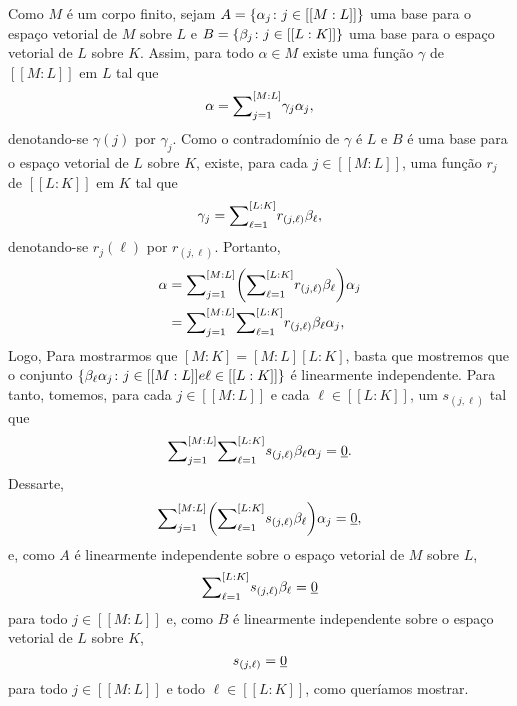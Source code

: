 \begin{dem}
  Como $M$ é um corpo finito, sejam
  $A=\left\{ \alpha_j\colon j\in[[M:L]] \right\}$
  uma base para o espaço vetorial de $M$ sobre $L$ e
  $B=\left\{ \beta_j\colon j\in[[L:K]] \right\}$
  uma base para o espaço vetorial de $L$ sobre $K$. Assim, para todo
  $\alpha\in M$ existe uma função $\gamma$ de $[[M:L]]$ em $L$ tal que
  \begin{equation*}
    \alpha = \mathbf{\sum}_{j=1}^{[M:L]}\gamma_j\alpha_j\mathrm{,}
  \end{equation*}
  denotando-se $\gamma(j)$ por $\gamma_j$. Como o contradomínio de
  $\gamma$ é $L$ e $B$ é uma base para o espaço vetorial
  de $L$ sobre $K$, existe, para cada $j\in[[M:L]]$, uma função $r_j$ de
  $[[L:K]]$ em $K$ tal que
  \begin{equation*}
    \gamma_j
    = \mathbf{\sum}_{\ell=1}^{[L:K]}r_{(j,\ell)}\beta_{\ell}\mathrm{,}
  \end{equation*}
  denotando-se $r_j(\ell)$ por $r_{(j,\ell)}$.
  Portanto,
  \begin{equation*}
    \begin{aligned}
      \alpha &= \mathbf{\sum}_{j=1}^{[M:L]}\biggl(
      \mathbf{\sum}_{\ell=1}^{[L:K]}r_{(j,\ell)}\beta_{\ell}
      \biggr)
      \alpha_j\\
      &= \mathbf{\sum}_{j=1}^{[M:L]}
      \mathbf{\sum}_{\ell=1}^{[L:K]}
      r_{(j,\ell)}\beta_{\ell}
      \alpha_j\mathrm{,}
    \end{aligned}
  \end{equation*}
  Logo, Para mostrarmos que $[M:K]=[M:L][L:K]$, basta que mostremos que
  o conjunto $\left\{ \beta_{\ell}\alpha_{j}\colon j\in[[M:L]] e
    \ell\in[[L:K]] \right\}$ é linearmente independente.
  Para tanto, tomemos,
  para cada $j\in[[M:L]]$ e cada $\ell\in[[L:K]]$,
    um $s_{(j,\ell)}$ tal
  que
  \begin{equation*}
    \mathbf{\sum}_{j=1}^{[M:L]}\mathbf{\sum}_{\ell=1}^{[L:K]}
    s_{(j,\ell)}\beta_{\ell}\alpha_j=\underline{0}\mathrm{.}
  \end{equation*}
  Dessarte,
  \begin{equation*}
    \mathbf{\sum}_{j=1}^{[M:L]}\biggl(
    \mathbf{\sum}_{\ell=1}^{[L:K]}
    s_{(j,\ell)}\beta_{\ell}\biggr)\alpha_j=\underline{0}\mathrm{,}
  \end{equation*}
  e, como $A$ é linearmente independente sobre
  o espaço vetorial de $M$ sobre $L$,
  \begin{equation*}
    \mathbf{\sum}_{\ell=1}^{[L:K]}
    s_{(j,\ell)}\beta_{\ell} = \underline{0}
  \end{equation*}
  para todo $j\in[[M:L]]$
  e, como $B$ é linearmente independente sobre
  o espaço vetorial de $L$ sobre $K$,
  \begin{equation*}
    s_{(j,\ell)} = \underline{0}
  \end{equation*}
  para todo $j\in[[M:L]]$ e todo $\ell\in[[L:K]]$, como queríamos
  mostrar.
\end{dem}

